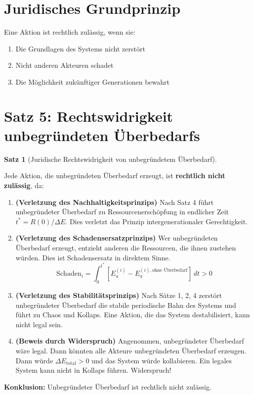 \documentclass[a4paper,11pt]{report}
\theoremstyle{definition}
\newtheorem{satz}{Satz}[chapter]
\begin{document}
\section{Juridisches Grundprinzip}

Eine Aktion ist rechtlich zulässig, wenn sie:

\begin{enumerate}
    \item Die Grundlagen des Systems nicht zerstört
    \item Nicht anderen Akteuren schadet
    \item Die Möglichkeit zukünftiger Generationen bewahrt
\end{enumerate}

\section{Satz 5: Rechtswidrigkeit unbegründeten Überbedarfs}

\begin{satz}[Juridische Rechtswidrigkeit von unbegründetem Überbedarf]\label{satz:rechtlich}
    
    Jede Aktion, die unbegründeten Überbedarf erzeugt, ist \textbf{rechtlich nicht zulässig}, da:
    
    \begin{enumerate}
        \item \textbf{(Verletzung des Nachhaltigkeitsprinzips)} Nach Satz 4 führt unbegründeter Überbedarf zu Ressourcenerschöpfung in endlicher Zeit $t^* = R(0)/\Delta E$. Dies verletzt das Prinzip intergenerationaler Gerechtigkeit.
        
        \item \textbf{(Verletzung des Schadensersatzprinzips)} Wer unbegründeten Überbedarf erzeugt, entzieht anderen die Ressourcen, die ihnen zustehen würden. Dies ist Schadensersatz in direktem Sinne.
        \begin{equation}
            \text{Schaden}_i = \int_0^{t^*} [E_a^{(i)} - E_a^{(i), \text{ohne Überbedarf}}] \, dt > 0
        \end{equation}
        
        \item \textbf{(Verletzung des Stabilitätsprinzips)} Nach Sätze 1, 2, 4 zerstört unbegründeter Überbedarf die stabile periodische Bahn des Systems und führt zu Chaos und Kollaps. Eine Aktion, die das System destabilisiert, kann nicht legal sein.
        
        \item \textbf{(Beweis durch Widerspruch)} Angenommen, unbegründeter Überbedarf wäre legal. Dann könnten alle Akteure unbegründeten Überbedarf erzeugen. Dann würde $\Delta E_{\text{total}} > 0$ und das System würde kollabieren. Ein legales System kann nicht in Kollaps führen. Widerspruch!
    \end{enumerate}
    
    \textbf{Konklusion:} Unbegründeter Überbedarf ist rechtlich nicht zulässig.
\end{satz}
\end{document}
